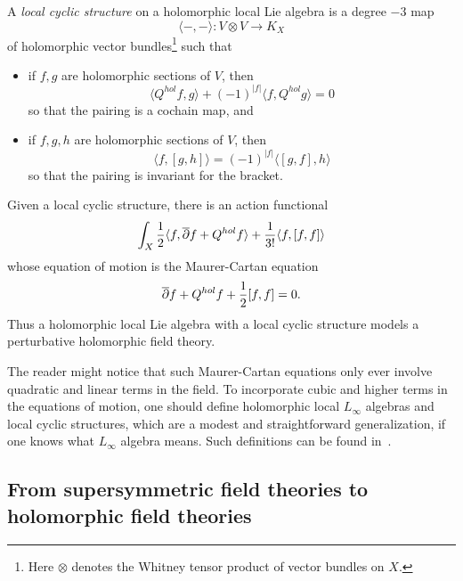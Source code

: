 \documentclass[11pt]{amsart}
\begin{document}
\begin{dfn}
A {\em local cyclic structure} on a holomorphic local Lie algebra is a degree $-3$ map
\[
\langle -,-\rangle \colon V \otimes V \to K_X
\]
of holomorphic vector bundles\footnote{Here $\otimes$ denotes the Whitney tensor product of vector bundles on $X$.} such that 
\begin{itemize}
\item if $f, g$ are holomorphic sections of $V$, then 
\[
\langle Q^{hol}f, g \rangle + (-1)^{|f|} \langle f, Q^{hol} g \rangle = 0
\]
so that the pairing is a cochain map, and
\item if $f, g, h$ are holomorphic sections of $V$, then 
\[
\langle f, [g,h] \rangle = (-1)^{|f|} \langle [g,f],h \rangle
\]
so that the pairing is invariant for the bracket.
\end{itemize}
\end{dfn}

Given a local cyclic structure, there is an action functional
\[
\int_X \frac{1}{2} \langle f, {\overline{\partial}} f + Q^{hol} f \rangle + \frac{1}{3!} \langle f, [f,f] \rangle 
\]
whose equation of motion is the Maurer-Cartan equation
\[
{\overline{\partial}} f + Q^{hol}f + \frac{1}{2} [f,f] = 0.
\]
Thus a holomorphic local Lie algebra with a local cyclic structure models a perturbative holomorphic field theory.

The reader might notice that such Maurer-Cartan equations only ever involve quadratic and linear terms in the field.
To incorporate cubic and higher terms in the equations of motion,
one should define holomorphic local $L_\infty$ algebras and local cyclic structures,
which are a modest and straightforward generalization, if one knows what $L_\infty$ algebra means.
Such definitions can be found in~\cite{CG2}.

%





\subsection{From supersymmetric field theories to holomorphic field theories}
\end{document}
